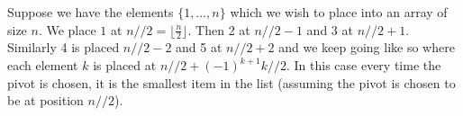 \begin{remark}
Suppose we have the elements $\{1, \dots, n\}$ which we wish to place into an array of size $n$. We place $1$ at $n // 2 = \lfloor \frac{n}{2} \rfloor$. Then 2 at $n//2 - 1$ and $3$ at $n//2 + 1$. Similarly 4 is placed $n//2 - 2$ and 5 at $n//2 + 2$ and we keep going like so where each element $k$ is placed at $n//2 + (-1)^{k + 1} k//2$. In this case every time the pivot is chosen, it is the smallest item in the list (assuming the pivot is chosen to be at position $n//2$).
\end{remark}